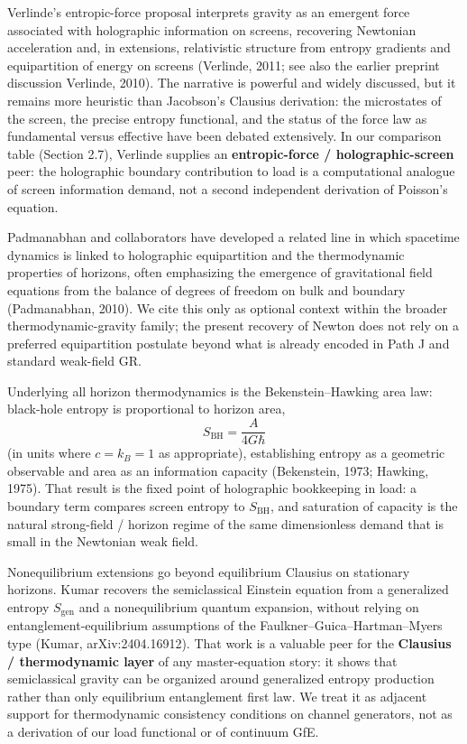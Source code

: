 \documentclass[
  11pt,
]{article}
\newcounter{none} %
\begin{document}
Verlinde's entropic-force proposal interprets gravity as an emergent force associated with holographic information on screens, recovering Newtonian acceleration and, in extensions, relativistic structure from entropy gradients and equipartition of energy on screens (Verlinde, 2011; see also the earlier preprint discussion Verlinde, 2010). The narrative is powerful and widely discussed, but it remains more heuristic than Jacobson's Clausius derivation: the microstates of the screen, the precise entropy functional, and the status of the force law as fundamental versus effective have been debated extensively. In our comparison table (Section 2.7), Verlinde supplies an \textbf{entropic-force / holographic-screen} peer: the holographic boundary contribution to load is a computational analogue of screen information demand, not a second independent derivation of Poisson's equation.

Padmanabhan and collaborators have developed a related line in which spacetime dynamics is linked to holographic equipartition and the thermodynamic properties of horizons, often emphasizing the emergence of gravitational field equations from the balance of degrees of freedom on bulk and boundary (Padmanabhan, 2010). We cite this only as optional context within the broader thermodynamic-gravity family; the present recovery of Newton does not rely on a preferred equipartition postulate beyond what is already encoded in Path J and standard weak-field GR.

Underlying all horizon thermodynamics is the Bekenstein--Hawking area law: black-hole entropy is proportional to horizon area, \[
S_{\mathrm{BH}} = \frac{A}{4G\hbar}
\] (in units where \(c=k_B=1\) as appropriate), establishing entropy as a geometric observable and area as an information capacity (Bekenstein, 1973; Hawking, 1975). That result is the fixed point of holographic bookkeeping in load: a boundary term compares screen entropy to \(S_{\mathrm{BH}}\), and saturation of capacity is the natural strong-field / horizon regime of the same dimensionless demand that is small in the Newtonian weak field.

Nonequilibrium extensions go beyond equilibrium Clausius on stationary horizons. Kumar recovers the semiclassical Einstein equation from a generalized entropy \(S_{\mathrm{gen}}\) and a nonequilibrium quantum expansion, without relying on entanglement-equilibrium assumptions of the Faulkner--Guica--Hartman--Myers type (Kumar, arXiv:2404.16912). That work is a valuable peer for the \textbf{Clausius / thermodynamic layer} of any master-equation story: it shows that semiclassical gravity can be organized around generalized entropy production rather than only equilibrium entanglement first law. We treat it as adjacent support for thermodynamic consistency conditions on channel generators, not as a derivation of our load functional or of continuum GfE.
\end{document}
